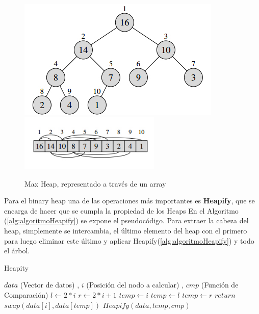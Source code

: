 \documentclass[a4paper,10pt]{article}
\begin{document}
\begin{figure}[!ht]
	\caption{Max Heap, representado a través de un array}
	\label{fig:heapMax}
	\begin{center}
	  \includegraphics[scale=0.6]{heap_maximo.jpg}	
	 \includegraphics[width=0.6\textwidth]{heap_array.jpg}
	\end{center}	
\end{figure}


Para el binary heap una de las operaciones más importantes es \textbf{Heapify}, que
se encarga de hacer que se cumpla la propiedad de los Heaps En el Algoritmo (\ref{alg:algoritmoHeapify}) se expone el pseudocódigo.
Para extraer la cabeza del heap, simplemente se intercambia, el último elemento del heap con el primero para luego eliminar este último y aplicar Heapify(\ref{alg:algoritmoHeapify}) y todo el árbol.

\begin{algorithm}[!h]
	
	\caption{Heapity} \label{alg:algoritmoHeapify}
	\begin{algorithmic} 
\REQUIRE $data$ (Vector de datos) , $i$ (Posición del nodo a calcular) , $cmp$ (Función de Comparación)
\STATE $l \leftarrow 2*i$
\STATE $r \leftarrow 2*i+1$
\STATE $temp \leftarrow i$
\STATE $temp \leftarrow l$
\ENDIF
{}
\STATE $temp \leftarrow r$
\ENDIF
{}
\STATE $return$
\ENDIF
\STATE $swap(data[i],data[temp])$
\STATE $Heapify(data,temp,cmp)$
\end{algorithmic}
\end{algorithm}
\end{document}

